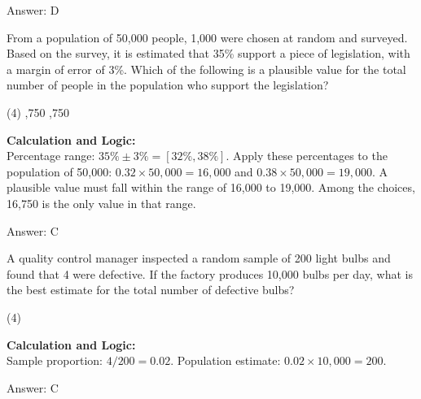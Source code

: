 \documentclass[11pt,paper=a4,answers]{exam}
\begin{document}
\begin{questions}
\begin{solution}
\vspace{30pt}

Answer: \colorbox{yellow!100}{D}
\end{solution}

\vspace{60pt}

\question
From a population of 50,000 people, 1,000 were chosen at random and surveyed. Based on the survey, it is estimated that 35\% support a piece of legislation, with a margin of error of 3\%. Which of the following is a plausible value for the total number of people in the population who support the legislation?
\begin{tasks}(4)
    ,750
    ,750
\end{tasks}

\begin{solution}
\textbf{Calculation and Logic:} \\
Percentage range: $35\% \pm 3\% = [32\%, 38\%]$. Apply these percentages to the population of 50,000: $0.32 \times 50,000 = 16,000$ and $0.38 \times 50,000 = 19,000$. A plausible value must fall within the range of 16,000 to 19,000. Among the choices, 16,750 is the only value in that range.

\vspace{30pt}

Answer: \colorbox{yellow!100}{C}
\end{solution}

\vspace{60pt}

\question
A quality control manager inspected a random sample of 200 light bulbs and found that 4 were defective. If the factory produces 10,000 bulbs per day, what is the best estimate for the total number of defective bulbs?
\begin{tasks}(4)
\end{tasks}

\begin{solution}
\textbf{Calculation and Logic:} \\
Sample proportion: $4 / 200 = 0.02$. Population estimate: $0.02 \times 10,000 = 200$.

\vspace{30pt}

Answer: \colorbox{yellow!100}{C}
\end{solution}


\end{questions}
\end{document}
